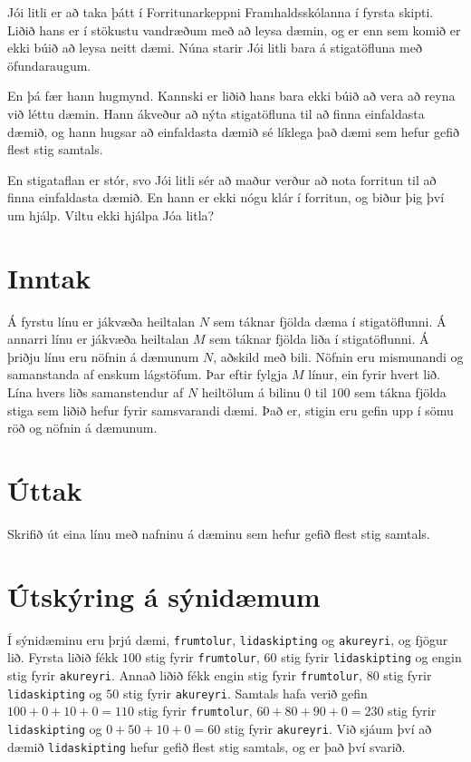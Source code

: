 

Jói litli er að taka þátt í Forritunarkeppni Framhaldsskólanna í fyrsta skipti. Liðið hans er í stökustu vandræðum með að leysa dæmin, og er enn sem komið er ekki búið að leysa neitt dæmi. Núna starir Jói litli bara á stigatöfluna með öfundaraugum.

En þá fær hann hugmynd. Kannski er liðið hans bara ekki búið að vera að reyna við léttu dæmin. Hann ákveður að nýta stigatöfluna til að finna einfaldasta dæmið, og hann hugsar að einfaldasta dæmið sé líklega það dæmi sem hefur gefið flest stig samtals.

En stigataflan er stór, svo Jói litli sér að maður verður að nota forritun til að finna einfaldasta dæmið. En hann er ekki nógu klár í forritun, og biður þig því um hjálp. Viltu ekki hjálpa Jóa litla?

\section*{Inntak}
Á fyrstu línu er jákvæða heiltalan $N$ sem táknar fjölda dæma í stigatöflunni. Á annarri línu er jákvæða heiltalan $M$ sem táknar fjölda liða í stigatöflunni. Á þriðju línu eru nöfnin á dæmunum $N$, aðskild með bili. Nöfnin eru mismunandi og samanstanda af enskum lágstöfum. Þar eftir fylgja $M$ línur, ein fyrir hvert lið. Lína hvers liðs samanstendur af $N$ heiltölum á bilinu $0$ til $100$ sem tákna fjölda stiga sem liðið hefur fyrir samsvarandi dæmi. Það er, stigin eru gefin upp í sömu röð og nöfnin á dæmunum.

\section*{Úttak}
Skrifið út eina línu með nafninu á dæminu sem hefur gefið flest stig samtals.

\section*{Útskýring á sýnidæmum}
Í sýnidæminu eru þrjú dæmi, \texttt{frumtolur}, \texttt{lidaskipting} og \texttt{akureyri}, og fjögur lið. Fyrsta liðið fékk $100$ stig fyrir \texttt{frumtolur}, $60$ stig fyrir \texttt{lidaskipting} og engin stig fyrir \texttt{akureyri}. Annað liðið fékk engin stig fyrir \texttt{frumtolur}, $80$ stig fyrir \texttt{lidaskipting} og $50$ stig fyrir \texttt{akureyri}. Samtals hafa verið gefin $100+0+10+0=110$ stig fyrir \texttt{frumtolur}, $60+80+90+0=230$ stig fyrir \texttt{lidaskipting} og $0+50+10+0=60$ stig fyrir \texttt{akureyri}. Við sjáum því að dæmið \texttt{lidaskipting} hefur gefið flest stig samtals, og er það því svarið.

